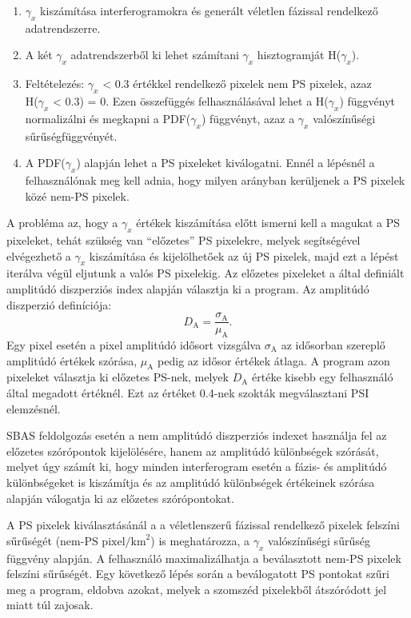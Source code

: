 \documentclass[12pt]{report}
\numberwithin{equation}{section}
\numberwithin{table}{section}
\numberwithin{figure}{section}
\begin{document}
\begin{enumerate}
    \item $\gamma_x$ kiszámítása interferogramokra és generált véletlen fázissal rendelkező adatrendszerre.
    \item A két $\gamma_x$ adatrendszerből ki lehet számítani $\gamma_x$ hisztogramját H($\gamma_x$).
    \item Feltételezés: $\gamma_x$ < 0.3 értékkel rendelkező pixelek nem PS pixelek, azaz\\H($\gamma_x$ < 0.3) = 0. Ezen összefüggés felhasználásával lehet a H($\gamma_x$) függvényt normalizálni és megkapni a PDF($\gamma_x$) függvényt, azaz a $\gamma_x$ valószínűségi sűrűségfüggvényét.
    \item A PDF($\gamma_x$) alapján lehet a PS pixeleket kiválogatni. Ennél a lépésnél a felhasználónak meg kell adnia, hogy milyen arányban kerüljenek a PS pixelek közé nem-PS pixelek.
\end{enumerate}
A probléma az, hogy a $\gamma_x$ értékek kiszámítása előtt ismerni kell a magukat a PS pixeleket, tehát szükség van ``előzetes'' PS pixelekre, melyek segítségével elvégezhető a $\gamma_x$ kiszámítása és kijelölhetőek az új PS pixelek, majd ezt a lépést iterálva végül eljutunk a valós PS pixelekig. Az előzetes pixeleket a \cite{Ferretti2001} által definiált amplitúdó diszperziós index alapján választja ki a program. Az amplitúdó diszperzió definíciója:
\[
    D_{\text{A}} = \frac{\sigma_{\text{A}}}{\mu_{\text{A}}}.
\]
Egy pixel esetén a pixel amplitúdó idősort vizsgálva $\sigma_{\text{A}}$ az idősorban szereplő amplitúdó értékek szórása, $\mu_{\text{A}}$ pedig az idősor értékek átlaga. A program azon pixeleket választja ki előzetes PS-nek, melyek $D_{\text{A}}$ értéke kisebb egy felhasználó által megadott értéknél. Ezt az értéket 0.4-nek szokták megválasztani PSI elemzésnél.

SBAS feldolgozás esetén a \stamps nem amplitúdó diszperziós indexet használja fel az előzetes szórópontok kijelölésére, hanem az amplitúdó különbségek szórását, melyet úgy számít ki, hogy minden interferogram esetén a fázis- és amplitúdó különbségeket is kiszámítja és az amplitúdó különbségek értékeinek szórása alapján válogatja ki az előzetes szórópontokat.

A PS pixelek kiválasztásánál a \stamps a véletlenszerű fázissal rendelkező pixelek felszíni sűrűségét ($\text{nem-PS pixel}/\text{km}^2$) is meghatározza, a $\gamma_x$ valószínűségi sűrűség függvény alapján. A felhasználó maximalizálhatja a beválasztott nem-PS pixelek felszíni sűrűségét. Egy következő lépés során a beválogatott PS pontokat szűri meg a program, eldobva azokat, melyek a szomszéd pixelekből átszóródott jel miatt túl zajosak.
\end{document}

